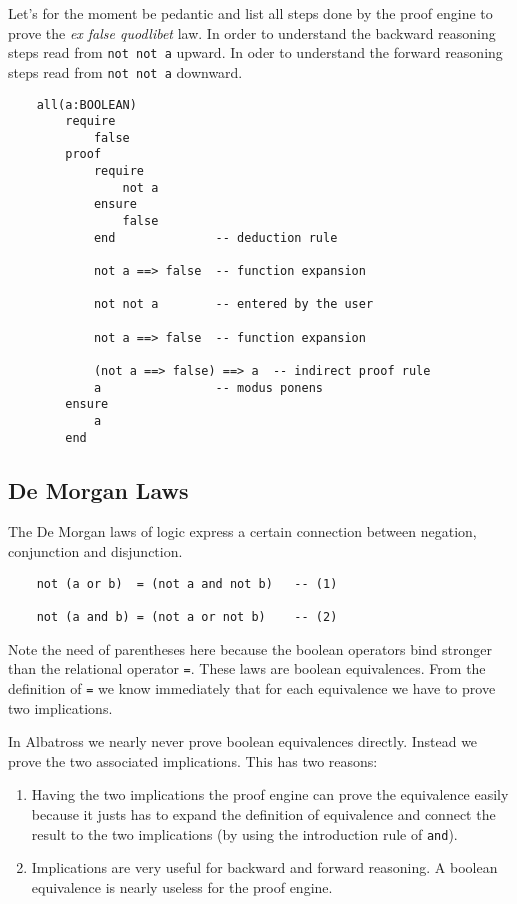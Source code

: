 Let's for the moment be pedantic and list all steps done by the proof engine
to prove the {\em ex false quodlibet} law. In order to understand the backward
reasoning steps read from \lstinline!not not a! upward. In oder to understand
the forward reasoning steps read from \lstinline!not not a! downward.

\begin{lstlisting}
    all(a:BOOLEAN)
        require
            false
        proof
            require
                not a
            ensure
                false
            end              -- deduction rule

            not a ==> false  -- function expansion

            not not a        -- entered by the user

            not a ==> false  -- function expansion

            (not a ==> false) ==> a  -- indirect proof rule
            a                -- modus ponens
        ensure
            a
        end
\end{lstlisting}



\subsection{De Morgan Laws}

The De Morgan laws of logic express a certain connection between negation,
conjunction and disjunction.

\begin{lstlisting}
    not (a or b)  = (not a and not b)   -- (1)

    not (a and b) = (not a or not b)    -- (2)
\end{lstlisting}

Note the need of parentheses here because the boolean operators bind stronger
than the relational operator \lstinline!=!. These laws are boolean
equivalences. From the definition of \lstinline!=! we know immediately that
for each equivalence we have to prove two implications.

In Albatross we nearly never prove boolean equivalences directly. Instead we
prove the two associated implications. This has two reasons:

\begin{enumerate}
\item Having the two implications the proof engine can prove the equivalence
  easily because it justs has to expand the definition of equivalence and
  connect the result to the two implications (by using the introduction rule
  of \lstinline!and!).

\item Implications are very useful for backward and forward reasoning. A
  boolean equivalence is nearly useless for the proof engine.
\end{enumerate}

